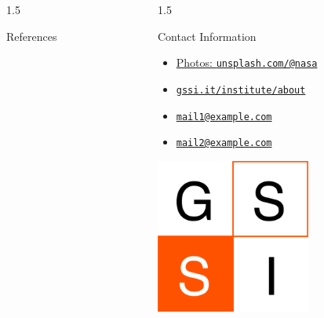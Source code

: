 \documentclass[final, 12pt]{beamer}
\newlength{\onecolwid}
\begin{document}
\begin{frame}[t]
\begin{columns}[t]
\begin{column}{1.5\onecolwid}
\begin{block}{References}

\begin{multicols}{2}
\small
\nocite{*}

\end{multicols}



\end{block}
\end{column}
\begin{column}{1.5\onecolwid}  
\begin{block}{Contact Information}
\centering
\begin{multicols}{2}
\small
\begin{itemize}
\item[\faPhoto] \href{https://unsplash.com/@nasa}{Photos: \texttt{unsplash.com/@nasa}}
\item[\faGlobe] \href{http://www.gssi.it/institute/about}{\texttt{gssi.it/institute/about}}
\item[\faEnvelope] \href{mailto:mail1@example.com}{\texttt{mail1@example.com}}
\item[\faEnvelope] \href{mailto:mail2@example.it}{\texttt{mail2@example.com}}
\end{itemize}
\end{multicols}
\end{block}

\begin{center}
\includegraphics[height=2in]{img/gssi.png}\hspace*{1.5em}
\end{center}

\end{column}

\end{columns}

\end{frame} %
\end{document}
